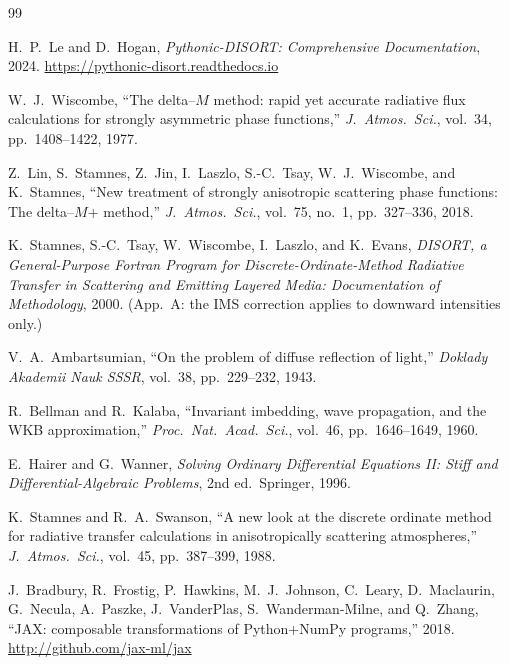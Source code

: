 \documentclass[11pt,a4paper]{article}
\theoremstyle{definition}
\begin{document}
\begin{thebibliography}{99}

  H.~P.~Le and D.~Hogan,
  \emph{Pythonic-DISORT: Comprehensive Documentation},
  2024.
  \url{https://pythonic-disort.readthedocs.io}

  W.~J.~Wiscombe,
  ``The delta--$M$ method: rapid yet accurate radiative flux calculations
  for strongly asymmetric phase functions,''
  \emph{J.\ Atmos.\ Sci.}, vol.~34, pp.~1408--1422, 1977.

  Z.~Lin, S.~Stamnes, Z.~Jin, I.~Laszlo, S.-C.~Tsay, W.~J.~Wiscombe,
  and K.~Stamnes,
  ``New treatment of strongly anisotropic scattering phase functions:
  The delta--$M$+ method,''
  \emph{J.\ Atmos.\ Sci.}, vol.~75, no.~1, pp.~327--336, 2018.

  K.~Stamnes, S.-C.~Tsay, W.~Wiscombe, I.~Laszlo, and K.~Evans,
  \emph{DISORT, a General-Purpose Fortran Program for Discrete-Ordinate-Method
  Radiative Transfer in Scattering and Emitting Layered Media: Documentation of
  Methodology}, 2000. (App.~A: the IMS correction applies to downward intensities only.)

  V.~A.~Ambartsumian,
  ``On the problem of diffuse reflection of light,''
  \emph{Doklady Akademii Nauk SSSR}, vol.~38, pp.~229--232, 1943.

  R.~Bellman and R.~Kalaba,
  ``Invariant imbedding, wave propagation, and the WKB approximation,''
  \emph{Proc.\ Nat.\ Acad.\ Sci.}, vol.~46, pp.~1646--1649, 1960.

  E.~Hairer and G.~Wanner,
  \emph{Solving Ordinary Differential Equations II: Stiff and
  Differential-Algebraic Problems}, 2nd ed.\
  Springer, 1996.

  K.~Stamnes and R.~A.~Swanson,
  ``A new look at the discrete ordinate method for radiative
  transfer calculations in anisotropically scattering atmospheres,''
  \emph{J.\ Atmos.\ Sci.}, vol.~45, pp.~387--399, 1988.

\bibitem{jax2018github}
  J.~Bradbury, R.~Frostig, P.~Hawkins, M.~J.~Johnson, C.~Leary,
  D.~Maclaurin, G.~Necula, A.~Paszke, J.~VanderPlas, S.~Wanderman-Milne,
  and Q.~Zhang,
  ``JAX: composable transformations of Python+NumPy programs,''
  2018.
  \url{http://github.com/jax-ml/jax}


\end{thebibliography}
\end{document}
